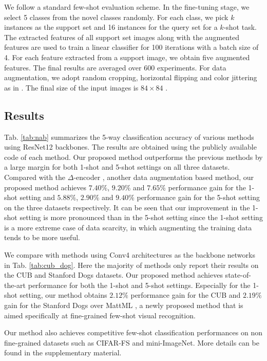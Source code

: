 \documentclass[10pt,twocolumn,letterpaper]{article}
\begin{document}
      We follow a standard few-shot evaluation scheme. 
      In the fine-tuning stage, we select 5 classes from the novel classes randomly. 
      For each class, we pick $k$ instances as the support set and 16
      instances for the query set for a $k$-shot task. The extracted features of all support set images along
      with the augmented features are used to train a linear classifier for 100 iterations with a batch size
      of 4. 
      For each feature extracted from a support image, we obtain five augmented features. The final
      results are averaged over 600 experiments.
      For data augmentation, we adopt random cropping, horizontal flipping and color jittering as in \cite{closer-look}. The final
      size of the input images is $84\times84$ .
      
       \subsection{Results} 
    Tab. \ref{tab:nab} summarizes the 5-way classification accuracy of  various methods using ResNet12 backbones.
The results are obtained using the publicly available code of each method.
Our proposed method outperforms the previous methods by a large margin for both 1-shot and 5-shot settings on all three datasets.
Compared with the $\Delta$-encoder \cite{delta-encoder}, another data augmentation based method, our proposed method achieves $7.40\%$, $9.20\%$ and $7.65\%$ performance gain for the  1-shot setting and $5.88\%$, $2.90\%$ and $9.40\%$ performance gain for the 5-shot setting on the three datasets respectively.
It can be seen that our improvement in the 1-shot setting is more pronounced than in the 5-shot setting since the 1-shot setting is a more extreme case of data scarcity, in which augmenting the training data tends to be more useful. 
    
    We compare with methods using Conv4 architectures as the backbone networks in Tab. \ref{tab:cub_dog}. Here the majority of methods only report their results on the CUB and Stanford Dogs datasets. 
Our proposed method achieves state-of-the-art performance for both the 1-shot and 5-shot settings.
Especially for the 1-shot setting, our method obtains $2.12\%$ performance gain for the CUB and $2.19\%$ gain for the Stanford Dogs over MattML \cite{MattML}, a newly proposed method that is aimed specifically at fine-grained few-shot visual recognition. 
    
    Our method also achieves competitive few-shot classification performances on non fine-grained datasets such as CIFAR-FS\cite{Bertinetto2019MetalearningWD} and mini-ImageNet\cite{matchingnet,meta_learn_lstm}. More details can be found in the supplementary material.
   
\end{document}
